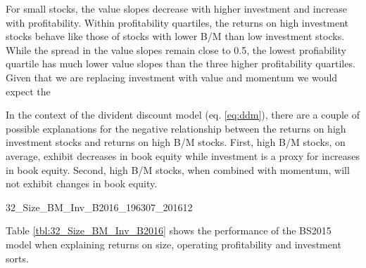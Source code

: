 For small stocks, the value slopes decrease with higher investment and increase with
profitability. Within profitability quartiles, the returns on high investment stocks
behave like those of stocks with lower B/M than low investment stocks. While the spread in
the value slopes remain close to 0.5, the lowest profiability quartile has much lower
value slopes than the three higher profitability quartiles.
Given that we are replacing investment with value and momentum we would expect the 

In the context of the divident
discount model (eq. \ref{eq:ddm}), there are a couple of possible explanations for the
negative relationship between the returns on high investment stocks and returns on high
B/M stocks. First,  high B/M stocks, on average, exhibit decreases in book equity
\parencite{kok2017facts} while investment is a proxy for increases in book equity. Second,
high B/M stocks, when combined with momentum, will not exhibit changes in book equity.

\begin{landscape}
{32_Size_BM_Inv_B2016_196307_201612}
\end{landscape}

Table \ref{tbl:32_Size_BM_Inv_B2016} shows the performance of the BS2015 model when
explaining returns on size, operating profitability and investment sorts. 
